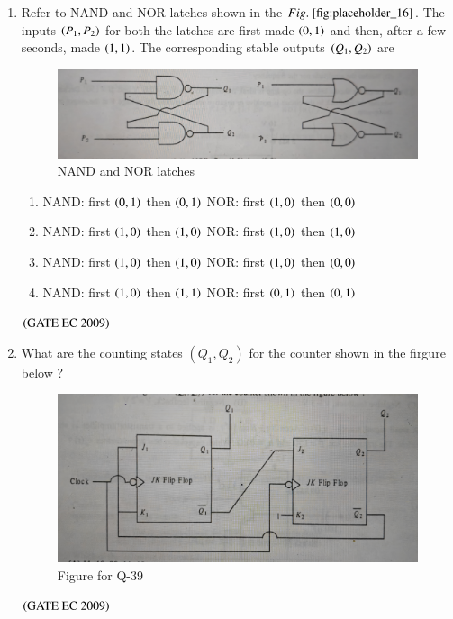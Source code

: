 \documentclass[journal,12pt,onecolumn]{IEEEtran}
\theoremstyle{remark}
\begin{document}
\begin{enumerate}[start=1, label={Q\arabic*.}]
\item Refer to NAND and NOR latches shown in the $\figref{fig:placeholder_16}$. The inputs $\left(P_1,P_2\right)$ for both the latches are first made $\left(0,1\right)$ and then, after a few seconds, made $\left(1,1\right)$. The corresponding stable outputs $\left(Q_1, Q_2\right)$ are
\begin{figure}[H]
    \centering
    \includegraphics[width=0.5\columnwidth]{figs/img_16.jpg}
    \caption{\centering NAND and NOR latches}
    \label{fig:placeholder_16}
\end{figure}
\begin{enumerate}
    \item NAND: first $\left(0,1\right)$ then $\left(0,1\right)$   NOR: first $\left(1,0\right)$ then $\left(0,0\right)$
    \item NAND: first $\left(1,0\right)$ then $\left(1,0\right)$   NOR: first $\left(1,0\right)$ then $\left(1,0\right)$
    \item NAND: first $\left(1,0\right)$ then $\left(1,0\right)$   NOR: first $\left(1,0\right)$ then $\left(0,0\right)$
    \item NAND: first $\left(1,0\right)$ then $\left(1,1\right)$   NOR: first $\left(0,1\right)$ then $\left(0,1\right)$
\end{enumerate}
\hfill $\left(\text{GATE EC 2009}\right)$

\item What are the counting states $(Q_1, Q_2)$ for the counter shown in the firgure below ?
\begin{figure}[H]
    \centering
    \includegraphics[width=0.5\columnwidth]{figs/img_17.jpg}
    \caption{\centering Figure for Q-39}
    \label{fig:placeholder_17}
\end{figure}
\begin{enumerate}
\end{enumerate}
\hfill $\left(\text{GATE EC 2009}\right)$


\end{enumerate}
\end{document}
